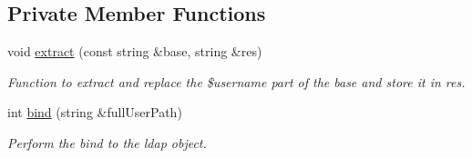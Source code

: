 \subsection*{Private Member Functions}
\begin{DoxyCompactItemize}
\item 
void \hyperlink{classLDAPProxy_a7cb44d3717d2654ac29f073de2e59c49}{extract} (const string \&base, string \&res)
\begin{DoxyCompactList}\small\item\em Function to extract and replace the \$username part of the base and store it in res. \item\end{DoxyCompactList}\item 
int \hyperlink{classLDAPProxy_a7c5ce7790b1fa23ca64cb5ada48266ca}{bind} (string \&fullUserPath)
\begin{DoxyCompactList}\small\item\em Perform the bind to the ldap object. \item\end{DoxyCompactList}\end{DoxyCompactItemize}
